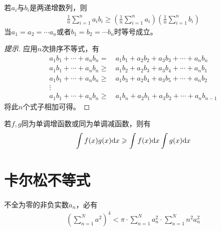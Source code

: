 \begin{example}
  若$a_i$与$b_i$是两递增数列，则
  \begin{align*}
    \frac1n\sum_{i=1}^n a_ib_i\ge
    \left( \frac1n\sum_{i=1}^n a_i \right)
    \left( \frac1n\sum_{i=1}^n b_i \right)
  \end{align*}
  当$a_1=a_2=\cdots a_n$或者$b_1=b_2=\cdots b_n$时等号成立。
\end{example}
\begin{proof}[提示]
  应用$n$次排序不等式，有
  \begin{align*}
    a_1b_1 + \cdots + a_nb_n = &\,   a_1b_1 + a_2b_2 + a_3b_3 + \cdots + a_nb_n\\
    a_1b_1 + \cdots + a_nb_n \ge&\,  a_1b_2 + a_2b_3 + a_3b_4 + \cdots + a_nb_1\\
    a_1b_1 + \cdots + a_nb_n \ge&\,  a_1b_3 + a_2b_4 + a_3b_5 + \cdots + a_nb_2\\
    \vdots\\
    a_1b_1 + \cdots + a_nb_n \ge&\,  a_1b_n + a_2b_1 + a_3b_2 + \cdots + a_nb_{n-1}
  \end{align*}
  将此$n$个式子相加可得。
\end{proof}

\begin{example}[切比雪夫不等式的积分形式]
  若$f,g$同为单调增函数或同为单调减函数，则有
  \begin{align*}
    \int f(x)g(x)\mathrm{d}x\geqslant\int f(x)\mathrm{d}x\int g(x)\mathrm{d}x
  \end{align*}
\end{example}


\section{卡尔松不等式}
\label{sec:carlson-inequality}

\begin{theorem}
  不全为零的非负实数$a_n$，必有
  \begin{align}
    \left(\sum_{n=1}^N a^2 \right)^4 < \pi \cdot \sum_{n=1}^N a_n^2 \cdot \sum_{n=1}^N n^2 a_n^2
  \end{align}
\end{theorem}

